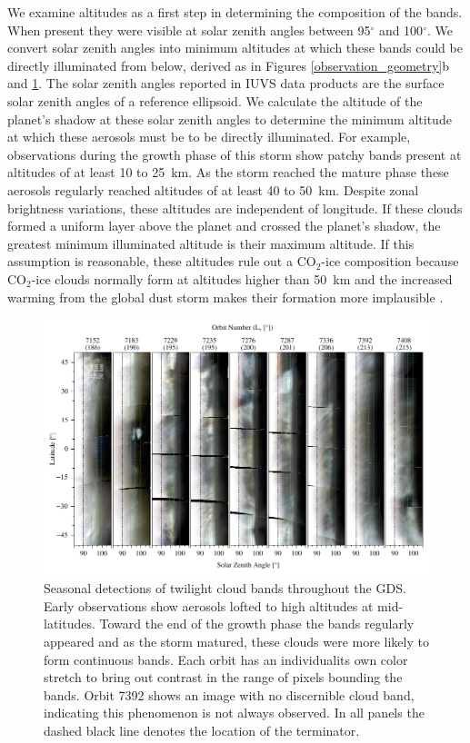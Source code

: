 \documentclass[draft]{agujournal2019}
\begin{document}
We examine altitudes as a first step in determining the composition of the bands. When present they were visible at solar zenith angles between 95$^\circ$ and 100$^\circ$. We convert solar zenith angles into minimum altitudes at which these bands could be directly illuminated from below, derived as in Figures \ref{observation_geometry}b and \ref{sza_alts_composite}. The solar zenith angles reported in IUVS data products are the surface solar zenith angles of a reference ellipsoid. We calculate the altitude of the planet's shadow at these solar zenith angles to determine the minimum altitude at which these aerosols must be to be directly illuminated. For example, observations during the growth phase of this storm show patchy bands present at altitudes of at least 10 to 25~km. As the storm reached the mature phase these aerosols regularly reached altitudes of at least 40 to 50~km. Despite zonal brightness variations, these altitudes are independent of longitude. If these clouds formed a uniform layer above the planet and crossed the planet's shadow, the greatest minimum illuminated altitude is their maximum altitude. If this assumption is reasonable, these altitudes rule out a $\mathrm{CO_2}$-ice composition because $\mathrm{CO_2}$-ice clouds normally form at altitudes higher than 50~km and the increased warming from the global dust storm makes their formation more implausible \cite{Clancy98, Clancy19}.

\begin{figure}[ht!]
    \centerline{\includegraphics[width=\textwidth]{sza_alts_composite.pdf}}
    \caption{Seasonal detections of twilight cloud bands throughout the GDS. Early observations show aerosols lofted to high altitudes at mid-latitudes. Toward the end of the growth phase the bands regularly appeared and as the storm matured, these clouds were more likely to form continuous bands. Each orbit has an individualits own color stretch to bring out contrast in the range of pixels bounding the bands. Orbit 7392 shows an image with no discernible cloud band, indicating this phenomenon is not always observed. In all panels the dashed black line denotes the location of the terminator.}
    \label{sza_alts_composite}
\end{figure}
\end{document}
